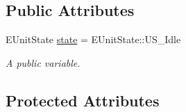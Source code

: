 \subsection*{Public Attributes}
\begin{DoxyCompactItemize}
\item 
E\+Unit\+State \hyperlink{class_a_unit2_d_a33b3a09dc710021ce343630e828ebb1b}{state} = E\+Unit\+State\+::\+U\+S\+\_\+\+Idle
\begin{DoxyCompactList}\small\item\em A public variable. \end{DoxyCompactList}\end{DoxyCompactItemize}
\subsection*{Protected Attributes}
